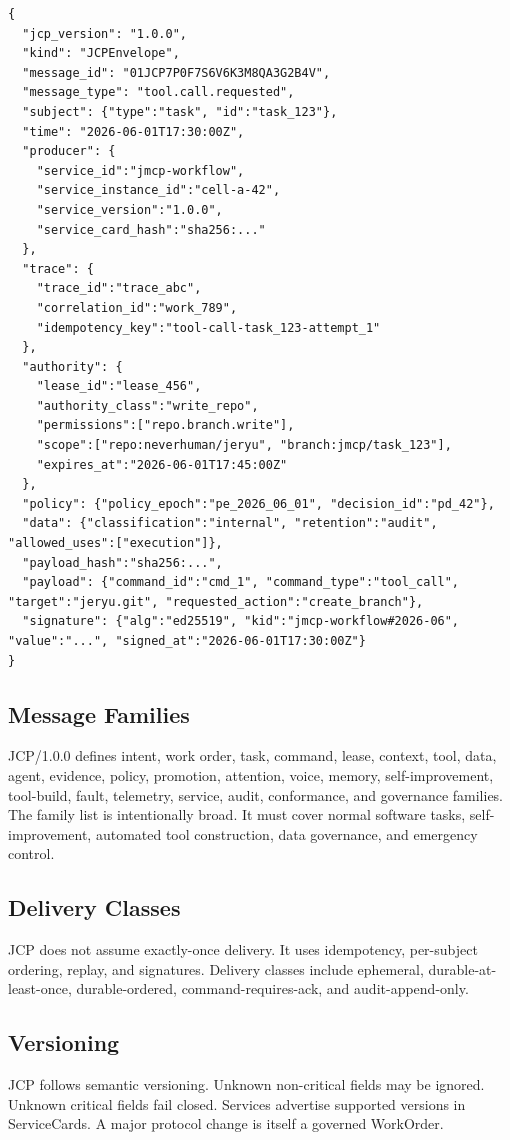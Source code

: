 \documentclass[12pt,journal,onecolumn,draftclsnofoot]{IEEEtran}
\begin{document}
\begin{lstlisting}[caption={Illustrative JCP/1.0.0 envelope.}]
{
  "jcp_version": "1.0.0",
  "kind": "JCPEnvelope",
  "message_id": "01JCP7P0F7S6V6K3M8QA3G2B4V",
  "message_type": "tool.call.requested",
  "subject": {"type":"task", "id":"task_123"},
  "time": "2026-06-01T17:30:00Z",
  "producer": {
    "service_id":"jmcp-workflow",
    "service_instance_id":"cell-a-42",
    "service_version":"1.0.0",
    "service_card_hash":"sha256:..."
  },
  "trace": {
    "trace_id":"trace_abc",
    "correlation_id":"work_789",
    "idempotency_key":"tool-call-task_123-attempt_1"
  },
  "authority": {
    "lease_id":"lease_456",
    "authority_class":"write_repo",
    "permissions":["repo.branch.write"],
    "scope":["repo:neverhuman/jeryu", "branch:jmcp/task_123"],
    "expires_at":"2026-06-01T17:45:00Z"
  },
  "policy": {"policy_epoch":"pe_2026_06_01", "decision_id":"pd_42"},
  "data": {"classification":"internal", "retention":"audit", "allowed_uses":["execution"]},
  "payload_hash":"sha256:...",
  "payload": {"command_id":"cmd_1", "command_type":"tool_call", "target":"jeryu.git", "requested_action":"create_branch"},
  "signature": {"alg":"ed25519", "kid":"jmcp-workflow#2026-06", "value":"...", "signed_at":"2026-06-01T17:30:00Z"}
}
\end{lstlisting}

\subsection{Message Families}
JCP/1.0.0 defines intent, work order, task, command, lease, context, tool, data, agent, evidence, policy, promotion, attention, voice, memory, self-improvement, tool-build, fault, telemetry, service, audit, conformance, and governance families. The family list is intentionally broad. It must cover normal software tasks, self-improvement, automated tool construction, data governance, and emergency control.

\subsection{Delivery Classes}
JCP does not assume exactly-once delivery. It uses idempotency, per-subject ordering, replay, and signatures. Delivery classes include ephemeral, durable-at-least-once, durable-ordered, command-requires-ack, and audit-append-only.

\subsection{Versioning}
JCP follows semantic versioning. Unknown non-critical fields may be ignored. Unknown critical fields fail closed. Services advertise supported versions in ServiceCards. A major protocol change is itself a governed WorkOrder.
\end{document}
